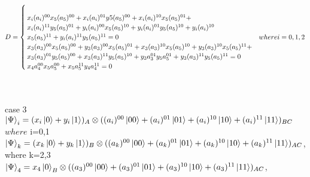 \documentclass[a4paper,12pt]{article}
\begin{document}
\begin{equation}
D=\begin{cases}
\newline \\
x_{i}(a_{i})^{00}x_{5}(a_{5})^{00}+x_{i}(a_{i})^{01}y{5}(a_{5})^{00}+x_{i}(a_{i})^{10}x_{5}(a_{5})^{01}+\\x_{i}(a_{i})^{11}y_{5}(a_{5})^{01}+y_{i}(a_{i})^{00}x_{5}(a_{5})^{10}+y_{i}(a_{i})^{01}y_{5}(a_{5})^{10}+y_{i}(a_{i})^{10}\\x_{5}(a_{5})^{11}+y_{i}(a_{i})^{11}y_{5}(a_{5})^{11}=0   &  where i=0,1,2
\newline \\

x_{3}(a_{3})^{00}x_{5}(a_{5})^{00}+y_{3}(a_{3})^{00}x_{5}(a_{5})^{01}+x_{3}(a_{3})^{10}x_{5}(a_{5})^{10}+y_{3}(a_{3})^{10}x_{5}(a_{5})^{11}+\\x_{3}(a_{3})^{01}y_{5}(a_{5})^{00}+x_{3}(a_{3})^{11}y_{5}(a_{5})^{10}+y_{3}a_{3}^{01}y_{5}a_{5}^{01}+^{}y_{3}(a_{3})^{11}y_{5}(a_{5})^{11}=0  
\newline\\
x_{4}a_{4}^{00}x_{5}a_{5}^{00}+x_{5}a_{5}^{11}y_{4}a_{4}^{11}=0
\end{cases}
\end{equation}



\leavevmode\\
\newline\\
case 3
\newline \\
$\ket{\Psi}_{i}=(x_{i}\ket{0}+y_{i}\ket{1})_{A}\otimes ((a_{i})^{00}\ket{00}+(a_{i})^{01}\ket{01}+(a_{i})^{10}\ket{10}+(a_{i})^{11}\ket{11})_{BC}     $  $where $ i=0,1$  $
\newline \\
$\ket{\Psi}_{k}=(x_{k}\ket{0}+y_{k}\ket{1})_{B}\otimes((a_{k})^{00}\ket{00}+(a_{k})^{01}\ket{01}+(a_{k})^{10}\ket{10}+(a_{k})^{11}\ket{11})_{AC}$, where k=2,3
\newline \\
$\ket{\Psi}_{4}=x_{4}\ket{0}_{B}\otimes((a_{3})^{00}\ket{00}+(a_{3})^{01}\ket{01}+(a_{3})^{10}\ket{10}+(a_{3})^{11}\ket{11})_{AC}$,
\end{document}
